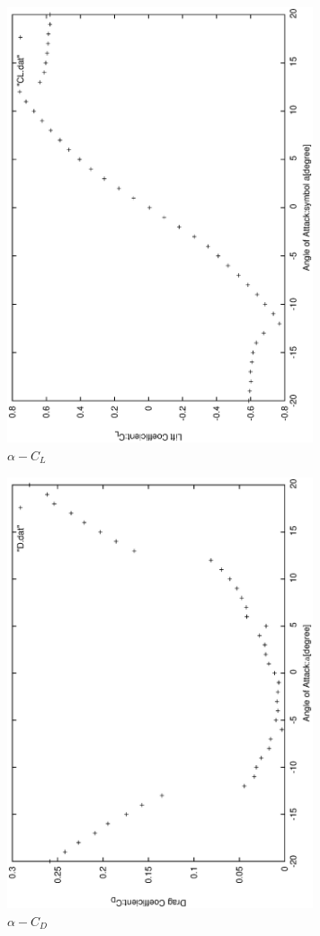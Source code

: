 \documentclass[a4j,twoside,openright,11pt]{jarticle}
\begin{document}
\newpage
\begin{figure}[htbp]
\begin{center}
\includegraphics[width=9cm,angle=-90]{./CL/CL.eps}
\end{center}
\caption{$\alpha - C_L$}
\end{figure}

\begin{figure}[htbp]
\begin{center}
\includegraphics[width=9cm,angle=-90]{./CD/CD.eps}
\end{center}
\caption{$\alpha - C_D$}
\end{figure}
\end{document}
